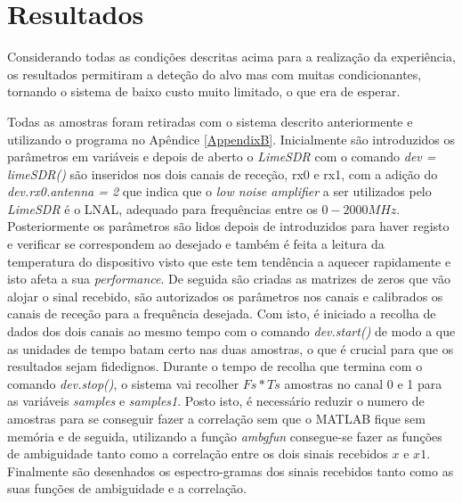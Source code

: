 \section{Resultados}
Considerando todas as condições descritas acima para a realização da experiência, os resultados permitiram a deteção do alvo mas com muitas condicionantes, tornando o sistema de baixo custo muito limitado, o que era de esperar.\par  
Todas as amostras foram retiradas com o sistema descrito anteriormente e utilizando o programa no Apêndice \ref{AppendixB}. Inicialmente são introduzidos os parâmetros em variáveis e depois de aberto o \textit{LimeSDR} com o comando \textit{dev = limeSDR()} são inseridos nos dois canais de receção, rx0 e rx1, com a adição do \textit{dev.rx0.antenna = 2} que indica que o \textit{low noise amplifier} a ser utilizados pelo \textit{LimeSDR} é o LNAL, adequado para frequências entre os $0 - 2000 MHz$. Posteriormente os parâmetros são lidos depois de introduzidos para haver registo e verificar se correspondem ao desejado e também é feita a leitura da temperatura do dispositivo visto que este tem tendência a aquecer rapidamente e isto afeta a sua \textit{performance}. De seguida são criadas as matrizes de zeros que vão alojar o sinal recebido, são autorizados os parâmetros nos canais e calibrados os canais de receção para a frequência desejada. Com isto, é iniciado a recolha de dados dos dois canais ao mesmo tempo com o comando \textit{dev.start()} de modo a que as unidades de tempo batam certo nas duas amostras, o que é crucial para que os resultados sejam fidedignos. Durante o tempo de recolha que termina com o comando \textit{dev.stop()}, o sistema vai recolher $Fs*Ts$ amostras no canal 0 e 1 para as variáveis \textit{samples} e \textit{samples1}. Posto isto, é necessário reduzir o numero de amostras para se conseguir fazer a correlação sem que o MATLAB fique sem memória e de seguida, utilizando a função \textit{ambgfun} consegue-se fazer as funções de ambiguidade tanto como a correlação entre os dois sinais recebidos $x$ e $x1$. Finalmente são desenhados os espectro-gramas  dos sinais recebidos tanto como as suas funções de ambiguidade e a correlação.\par 

